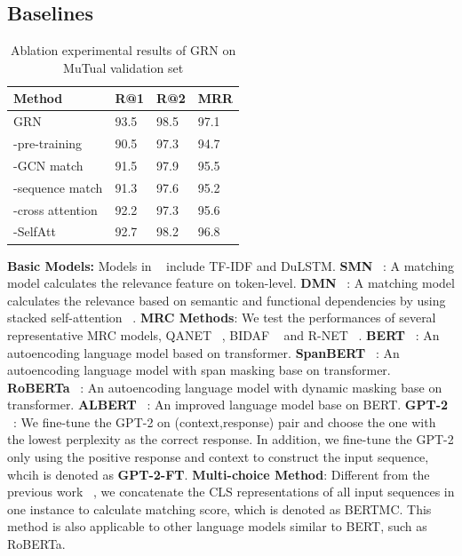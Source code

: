 \documentclass[letterpaper]{article} %
\begin{document}
\subsection{Baselines}
\begin{table}[t]
\centering
\begin{tabular}{l|l|l|l}
\hline
   Method & R@1 & R@2 & MRR \\  \hline
    GRN & 93.5 & 98.5 & 97.1 \\
   -pre-training  & 90.5 & 97.3 & 94.7 \\
   -GCN match & 91.5 & 97.9 & 95.5 \\
   -sequence match & 91.3 & 97.6 & 95.2  \\
   -cross attention & 92.2 & 97.3 & 95.6 \\
   -SelfAtt ~\cite{Vaswani2017} & 92.7 & 98.2 & 96.8  \\ \hline

\end{tabular}
\caption{Ablation experimental results of GRN on MuTual validation set}
\label{ablation_result}
\end{table}
\textbf{Basic Models:} Models in ~\cite{2015Lowe} include TF-IDF and DuLSTM. \textbf{SMN} ~\cite{Wu2017}: A matching model calculates the relevance feature on token-level. \textbf{DMN} ~\cite{Zhou2018}: A matching model
calculates the relevance based on semantic and functional dependencies by using stacked self-attention ~\cite{Vaswani2017}. \textbf{MRC Methods}: We test the performances of several representative MRC models, QANET ~\cite{yu2018qanet}, BIDAF ~\cite{seo2017bidirectional} and R-NET ~\cite{wang2017gated}. \textbf{BERT} ~\cite{devlin2018bert}: An autoencoding language model based on transformer.  \textbf{SpanBERT} ~\cite{joshi2020spanbert}: An autoencoding language model with span masking base on transformer. \textbf{RoBERTa} ~\cite{2019RoBERTa}: An autoencoding language model with dynamic masking base on transformer. \textbf{ALBERT} ~\cite{Lan2020}: An improved language model base on BERT. \textbf{GPT-2} ~\cite{Radford2018}: We fine-tune the GPT-2 on (context,response) pair and choose the one with the lowest perplexity as the correct response. In addition, we fine-tune the GPT-2 only using the positive response and context to construct the input sequence, whcih is denoted as \textbf{GPT-2-FT}. \textbf{Multi-choice Method}: Different from the previous work ~\cite{devlin2018bert}, we concatenate the CLS representations of all input sequences in one instance to calculate matching score, which is denoted as BERTMC. This method is also applicable to other language models similar to BERT, such as RoBERTa.
\end{document}
